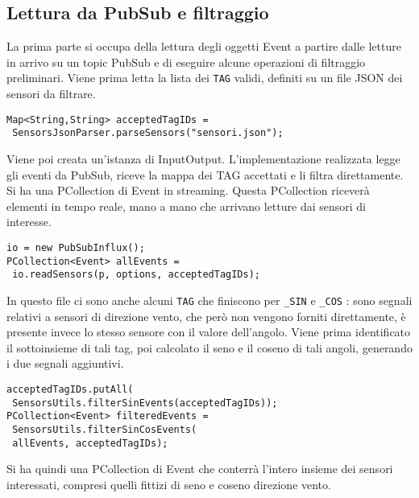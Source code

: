 \subsection{Lettura da PubSub e filtraggio}
La prima parte si occupa della lettura degli oggetti Event a partire dalle letture in arrivo su un topic PubSub e di eseguire alcune operazioni di filtraggio preliminari. 
 Viene prima letta la lista dei \texttt{TAG} validi, definiti su un file JSON dei sensori da filtrare.
\begin{lstlisting}
Map<String,String> acceptedTagIDs =
 SensorsJsonParser.parseSensors("sensori.json");
\end{lstlisting}
Viene poi creata un'istanza di InputOutput. L'implementazione realizzata legge gli eventi da PubSub, riceve la mappa dei TAG accettati e li filtra direttamente. Si ha una PCollection di Event in streaming. Questa PCollection riceverà elementi in tempo reale, mano a mano che arrivano letture dai sensori di interesse. 
\begin{lstlisting}
io = new PubSubInflux();
PCollection<Event> allEvents = 
 io.readSensors(p, options, acceptedTagIDs);
\end{lstlisting}
 In questo file ci sono anche alcuni \texttt{TAG} che finiscono per \texttt{\_SIN} e \texttt{\_COS} : sono segnali relativi a sensori di direzione vento, che però non vengono forniti direttamente, è presente invece lo stesso sensore con il valore dell'angolo. Viene prima identificato il sottoinsieme di tali tag, poi calcolato il seno e il coseno di tali angoli, generando i due segnali aggiuntivi.
\begin{lstlisting}
acceptedTagIDs.putAll(
 SensorsUtils.filterSinEvents(acceptedTagIDs));
PCollection<Event> filteredEvents =
 SensorsUtils.filterSinCosEvents(
 allEvents, acceptedTagIDs);
\end{lstlisting}
Si ha quindi una PCollection di Event che conterrà l'intero insieme dei sensori interessati, compresi quelli fittizi di seno e coseno direzione vento. 
